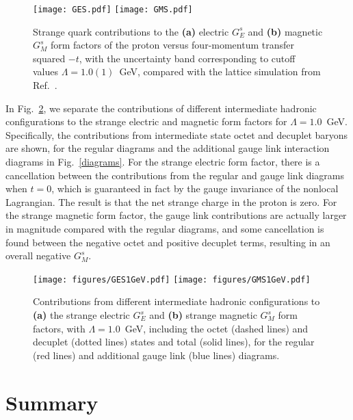 \documentclass[preprintnumbers,prd,superscriptaddress,preprint]{revtex4-1}
\begin{document}
\begin{figure}[] %
\graphicspath{{figures/}}
\texttt{[image: GES.pdf]} \hspace*{-0.1cm}
\texttt{[image: GMS.pdf]} \\[0.3cm]
\caption{Strange quark contributions to the {\bf (a)} electric $G_E^s$ and {\bf (b)} magnetic $G_M^s$ form factors of the proton versus four-momentum transfer squared $-t$, with the uncertainty band corresponding to cutoff values $\Lambda=1.0(1)$~GeV, compared with the lattice simulation from Ref.~\cite{Sufian:2017osl}.}
\label{gems}
\end{figure}


In Fig.~\ref{gems1GeV}, we separate the contributions of different intermediate hadronic configurations to the strange electric and magnetic form factors for $\Lambda=1.0$~GeV.
Specifically, the contributions from intermediate state octet and decuplet baryons are shown, for the regular diagrams and the additional gauge link interaction diagrams in Fig.~\ref{diagrams}.
For the strange electric form factor, there is a cancellation between the contributions from the regular and gauge link diagrams when $t=0$, which is guaranteed in fact by the gauge invariance of the nonlocal Lagrangian.
The result is that the net strange charge in the proton is zero.
For the strange magnetic form factor, the gauge link contributions are actually larger in magnitude compared with the regular diagrams, and some cancellation is found between the negative octet and positive decuplet terms, resulting in an overall negative $G_M^s$.


\begin{figure}[]
\graphicspath{{figures/}}
\texttt{[image: figures/GES1GeV.pdf]} \hspace*{-0.1cm}
\texttt{[image: figures/GMS1GeV.pdf]} \\[0.3cm]
\caption{Contributions from different intermediate hadronic configurations to {\bf (a)} the strange electric $G_E^s$ and {\bf (b)} strange magnetic $G_M^s$ form factors, with $\Lambda=1.0$~GeV, including the octet (dashed lines) and decuplet (dotted lines) states and total (solid lines), for the regular (red lines) and additional gauge link (blue lines) diagrams.} 
\label{gems1GeV}
\end{figure}


\section{Summary}
\label{sec.summary}
\end{document}
